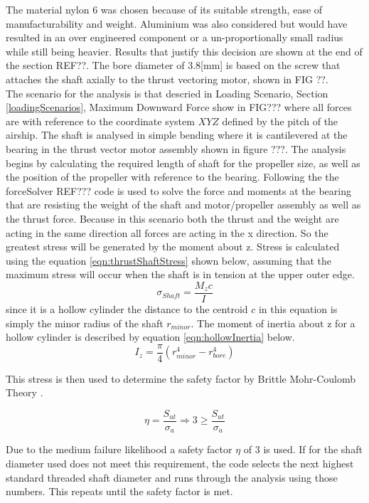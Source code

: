\documentclass[../main.tex]{subfiles}
\begin{document}
The material nylon 6 was chosen because of its suitable strength, ease of manufacturability and weight. Aluminium was also considered but would have resulted in an over engineered component or a un-proportionally small radius while still being heavier. Results that justify this decision are shown at the end of the section REF??. The bore diameter of 3.8[mm] is based on the screw that attaches the shaft axially to the thrust vectoring motor, shown in FIG ??.\\

The scenario for the analysis is that descried in Loading Scenario, Section \ref{loadingScenarios}, Maximum Downward Force show in FIG??? where all forces are with reference to the coordinate system $XYZ$ defined by the pitch of the airship. The shaft is analysed in simple bending where it is cantilevered at the bearing in the thrust vector motor assembly shown in figure ???. The analysis begins by calculating the required length of shaft for the propeller size, as well as the position of the propeller with reference to the bearing. Following the the forceSolver REF??? code is used to solve the force and moments at the bearing that are resisting the weight of the shaft and motor/propeller assembly as well as the thrust force. Because in this scenario both the thrust and the weight are acting in the same direction all forces are acting in the x direction. So the greatest stress will be generated by the moment about z. Stress is calculated using the equation \ref{eqn:thrustShaftStress} shown below, assuming that the maximum stress will occur when the shaft is in tension at the upper outer edge. 
\begin{equation}
\label{eqn:thrustShaftStress} 
\sigma _{Shaft}  = \dfrac{M_{z}c}{I} 
\end{equation}
since it is a hollow cylinder the distance to the centroid $c$ in this equation is simply the minor radius of the shaft $r_{minor}$. The moment of inertia about z for a hollow cylinder is described by equation \ref{eqn:hollowInertia} below.
\begin{equation}
\label{eqn:hollowInertia} 
I _{z}  = \dfrac{\pi}{4} (r_{minor}^4 - r_{bore}^4)
\end{equation}

This stress is then used to determine the safety factor by Brittle Mohr-Coulomb Theory \cite[227]{shigley}.

\begin{equation}
\eta = \dfrac{S_{ut}}{\sigma _a} \Rightarrow 3 \geq \dfrac{S_{ut}}{\sigma _a}
\end{equation}

Due to the medium failure likelihood a safety factor $\eta$ of 3 is used. If for the shaft diameter used does not meet this requirement, the code selects the next highest standard threaded shaft diameter and runs through the analysis using those numbers. This repeats until the safety factor is met. 
\end{document}
